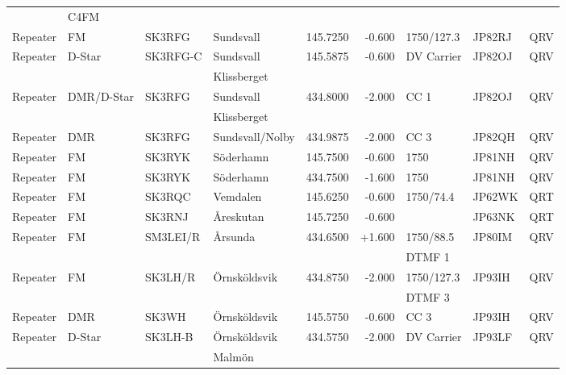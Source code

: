 \begin{longtable}{llllrrlll}
           & C4FM       &          &                  &             &          &            &        &      \\
Repeater   & FM         & SK3RFG   & Sundsvall        & 145.7250    & -0.600   & 1750/127.3 & JP82RJ & QRV  \\
Repeater   & D-Star     & SK3RFG-C & Sundsvall        & 145.5875    & -0.600   & DV Carrier & JP82OJ & QRV  \\
           &            &          & Klissberget      &             &          &            &        &      \\
Repeater   & DMR/D-Star & SK3RFG   & Sundsvall        & 434.8000    & -2.000   & CC 1       & JP82OJ & QRV  \\
           &            &          & Klissberget      &             &          &            &        &      \\
Repeater   & DMR        & SK3RFG   & Sundsvall/Nolby  & 434.9875    & -2.000   & CC 3       & JP82QH & QRV  \\
Repeater   & FM         & SK3RYK   & Söderhamn        & 145.7500    & -0.600   & 1750       & JP81NH & QRV  \\
Repeater   & FM         & SK3RYK   & Söderhamn        & 434.7500    & -1.600   & 1750       & JP81NH & QRV  \\
Repeater   & FM         & SK3RQC   & Vemdalen         & 145.6250    & -0.600   & 1750/74.4  & JP62WK & QRT  \\
Repeater   & FM         & SK3RNJ   & Åreskutan        & 145.7250    & -0.600   &            & JP63NK & QRT  \\
Repeater   & FM         & SM3LEI/R & Årsunda          & 434.6500    & +1.600   & 1750/88.5  & JP80IM & QRV  \\
           &            &          &                  &             &          & DTMF 1     &        &      \\
Repeater   & FM         & SK3LH/R  & Örnsköldsvik     & 434.8750    & -2.000   & 1750/127.3 & JP93IH & QRV  \\
           &            &          &                  &             &          & DTMF 3     &        &      \\
Repeater   & DMR        & SK3WH    & Örnsköldsvik     & 145.5750    & -0.600   & CC 3       & JP93IH & QRV  \\
Repeater   & D-Star     & SK3LH-B  & Örnsköldsvik     & 434.5750    & -2.000   & DV Carrier & JP93LF & QRV  \\
           &            &          & Malmön           &             &          &            &        &      \\

\end{longtable}
